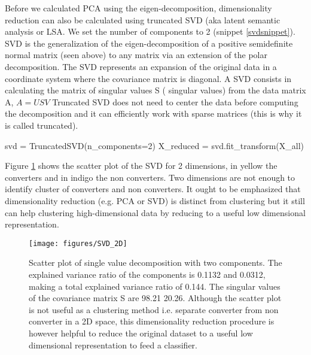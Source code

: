 \documentclass[11pt]{article}
\theoremstyle{definition}
\theoremstyle{remark}
\begin{document}
Before we calculated PCA using the eigen-decomposition, dimensionality reduction can also be calculated using truncated SVD (aka latent semantic analysis or LSA. We set the number of components to 2 (snippet \ref{svdsnippet}).  SVD is the generalization of the eigen-decomposition of a positive semidefinite normal matrix (seen above) to any matrix via an extension of the polar decomposition. 
The SVD represents an expansion of the original data in a coordinate system where the covariance matrix is diagonal. A SVD consists in calculating the matrix of singular values S ( singular values) from the data matrix A, $A = USV$
Truncated SVD does not need to center the data before computing the decomposition and it can efficiently work with sparse matrices (this is why it is called truncated). 

\begin{code}[caption=PCA truncated SVDs, label=svdsnippet]
svd = TruncatedSVD(n_components=2)
X_reduced = svd.fit_transform(X_all)
\end{code}

Figure \ref{fig:PCASVD} shows the scatter plot of the SVD for 2 dimensions, in yellow the converters and in indigo the non converters. Two dimensions are not enough to identify cluster of converters and non converters. It ought to be emphasized that dimensionality reduction (e.g. PCA or SVD) is distinct from clustering but it still can help clustering high-dimensional data by reducing to a useful low dimensional representation.

\begin{figure}[H] 
        \centering
        \texttt{[image: figures/SVD\_2D]}
        \caption{Scatter plot of single value decomposition with two components. The explained variance ratio of the components is 0.1132 and 0.0312, making a total explained variance ratio of  0.144. The singular values of the covariance matrix S are 98.21 20.26. Although the scatter plot is not useful as a clustering method i.e. separate converter from non converter in a 2D space, this dimensionality reduction procedure is however helpful to reduce the original dataset to a useful low dimensional representation to feed a classifier. 
        } \label{fig:PCASVD}
\end{figure}
\end{document}
